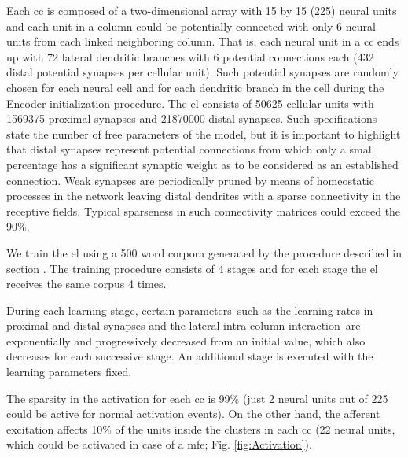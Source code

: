 {Each \gls{cc} is composed of a two-dimensional array with 15 by 15 (225) neural units and
each unit in a column could be potentially connected with only 6 neural units from each linked neighboring column. 
That is, each neural unit in a \gls{cc} ends up with 72 lateral dendritic branches with 6 potential connections each
(432 distal potential synapses per cellular unit).
Such potential synapses are randomly chosen for each neural cell and for each dendritic branch in the cell during the Encoder initialization procedure.
The \gls{el} consists of 50625 cellular units with 1569375 proximal synapses and 21870000 distal synapses.
Such specifications state the number of free parameters of the model, but it is important to highlight that distal synapses represent
potential connections from which only a small percentage has a significant synaptic weight as to be considered as an established connection.
Weak synapses are periodically pruned by means of homeostatic processes in the network leaving distal dendrites with a sparse connectivity in the receptive fields.
Typical sparseness in such connectivity matrices could exceed the 90\%.

We train the \gls{el} using a 500 word corpora generated by the procedure described in section .
The training procedure consists of 4 stages and for each stage the \gls{el} receives the same corpus 4 times.

During each learning stage, certain parameters--such as the learning rates in proximal and distal synapses and the lateral
intra-column interaction--are exponentially and progressively decreased from an initial value, which also decreases
for each successive stage.
An additional stage is executed with the learning parameters fixed.

The sparsity in the activation for each \gls{cc} is 99\% (just 2 neural units out of 225 could be active for normal activation events).
On the other hand, the afferent excitation affects 10\% of the units inside the clusters in each \gls{cc}
(22 neural units, which could be activated in case of a \gls{mfe}; Fig. \ref{fig:Activation}).
}










